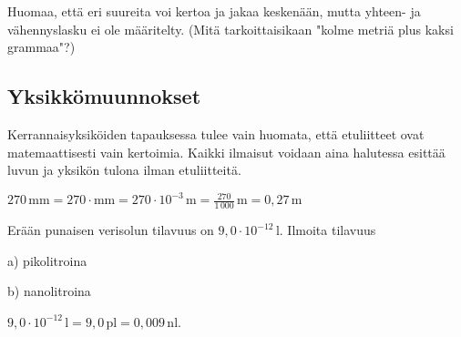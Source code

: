 



Huomaa, että eri suureita voi kertoa ja jakaa keskenään, mutta yhteen- ja vähennyslasku ei ole määritelty. (Mitä tarkoittaisikaan "kolme metriä plus kaksi grammaa"?)

\subsection*{Yksikkömuunnokset}

Kerrannaisyksiköiden tapauksessa tulee vain huomata, että etuliitteet ovat matemaattisesti vain kertoimia. Kaikki ilmaisut voidaan aina halutessa esittää luvun ja yksikön tulona ilman etuliitteitä. %

\begin{esimerkki}
$270\,\text{mm}=270\cdot\text{mm}=270\cdot10^{-3}\,\text{m}=\frac{270}{1\,000}\,\text{m}=0,27\,\text{m}$
\end{esimerkki}

\begin{esimerkki}
Erään punaisen verisolun tilavuus on $9,0 \cdot 10^{-12}\,\textrm{l}$. Ilmoita tilavuus

a) pikolitroina

b) nanolitroina

\begin{esimratk}
$9,0 \cdot 10^{-12}\,\textrm{l} = 9,0\,\textrm{pl} = 0,009\,\textrm{nl}$.
\end{esimratk}
\end{esimerkki}


